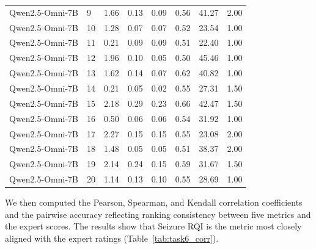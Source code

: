 \documentclass{article}
\theoremstyle{plain}
\theoremstyle{definition}
\theoremstyle{remark}
\begin{document}
\begin{table}[t]
{\begin{tabular}{llrrrrrr}
Qwen2.5-Omni-7B & 9 & 1.66 & 0.13 & 0.09 & 0.56 & 41.27 & 2.00 \\
Qwen2.5-Omni-7B & 10 & 1.28 & 0.07 & 0.07 & 0.52 & 23.54 & 1.00 \\
Qwen2.5-Omni-7B & 11 & 0.21 & 0.09 & 0.09 & 0.51 & 22.40 & 1.00 \\
Qwen2.5-Omni-7B & 12 & 1.96 & 0.10 & 0.05 & 0.50 & 45.46 & 1.00 \\
Qwen2.5-Omni-7B & 13 & 1.62 & 0.14 & 0.07 & 0.62 & 40.82 & 1.00 \\
Qwen2.5-Omni-7B & 14 & 0.21 & 0.05 & 0.02 & 0.55 & 27.31 & 1.50 \\
Qwen2.5-Omni-7B & 15 & 2.18 & 0.29 & 0.23 & 0.66 & 42.47 & 1.50 \\
Qwen2.5-Omni-7B & 16 & 0.50 & 0.06 & 0.06 & 0.54 & 31.92 & 1.00 \\
Qwen2.5-Omni-7B & 17 & 2.27 & 0.15 & 0.15 & 0.55 & 23.08 & 2.00 \\
Qwen2.5-Omni-7B & 18 & 1.48 & 0.05 & 0.05 & 0.51 & 38.37 & 2.00 \\
Qwen2.5-Omni-7B & 19 & 2.14 & 0.24 & 0.15 & 0.59 & 31.67 & 1.50 \\
Qwen2.5-Omni-7B & 20 & 1.14 & 0.13 & 0.10 & 0.55 & 28.69 & 1.00 \\
\hline
\end{tabular}
}
\end{table}

\vspace{1em}   %



We then computed the Pearson, Spearman, and Kendall correlation coefficients and the pairwise accuracy reflecting ranking consistency between five metrics and the expert scores. The results show that Seizure RQI is the metric most closely aligned with the expert ratings  (Table~\ref{tab:task6_corr}).
\end{document}
